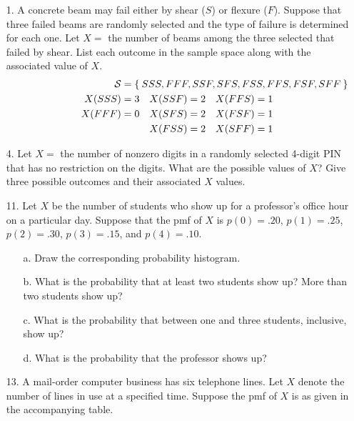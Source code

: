 \documentclass[letterpaper,12pt]{article}
\begin{document}
\maketitle

\begin{enumerate}
  \item[1.]
    A concrete beam may fail either by shear ($S$) or flexure ($F$). Suppose that three failed beams are randomly selected and the type of failure is determined for each one. Let $X =$ the number of beams among the three selected that failed by shear. List each outcome in the sample space along with the associated value of $X$.
    \begin{align*}
      \mathcal{S} &= \mathrlap{\Set{SSS, FFF, SSF, SFS, FSS, FFS, FSF, SFF}} & & & & \\
      X(SSS) &= 3 & X(SSF) &= 2 & X(FFS) &= 1 \\
      X(FFF) &= 0 & X(SFS) &= 2 & X(FSF) &= 1 \\
                & & X(FSS) &= 2 & X(SFF) &= 1
    \end{align*}
  \item[4.]
    Let $X =$ the number of nonzero digits in a randomly selected 4-digit PIN that has no restriction on the digits. What are the possible values of $X$? Give three possible outcomes and their associated $X$ values.
  \item[11.]
    Let $X$ be the number of students who show up for a professor’s office hour on a particular day. Suppose that the pmf of $X$ is $p(0) = .20$, $p(1) = .25$, $p(2) = .30$, $p(3) = .15$, and $p(4) = .10$.
    \begin{enumerate}
      \item[a.]
        Draw the corresponding probability histogram.
      \item[b.]
        What is the probability that at least two students show up? More than two students show up?
      \item[c.]
        What is the probability that between one and three students, inclusive, show up?
      \item[d.]
        What is the probability that the professor shows up?
    \end{enumerate}
  \item[13.]
    A mail-order computer business has six telephone lines. Let $X$ denote the number of lines in use at a specified time. Suppose the pmf of $X$ is as given in the accompanying table.
    \begin{center}
\end{center}
\end{enumerate}
\end{document}
